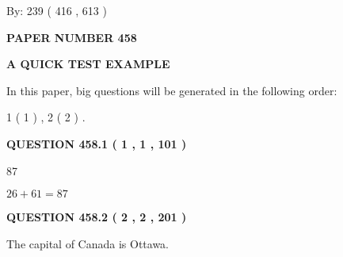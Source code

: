 \documentclass[12pt]{article}
\begin{document}
   
\hspace{1.0in} By: 
 239 ( 416 ,  613 )
   
   
   
   
\newpage 
\setcounter{page}{ 
   458001 } 
   
   
   
   
 {\textbf{ \Large{ PAPER NUMBER  458  }}}
   
   
\vspace{0.2in}
   
   
   
   
   
   
 \vspace{0.2in}
{\LARGE {\textbf{ A QUICK TEST EXAMPLE}}}
   
   
   
\vspace{0.2in}
   
In this paper, big questions will be generated in the following order: 
   
   
   1 ( 1 )
 ,
   2 ( 2 )
 .
  
\vspace{0.2in}
  
{\textbf{\Large{QUESTION
458.1 
 ( 1 , 1 , 101 )
}}}
  
  
 
 
\noindent{}

87
 
 
 
 
\noindent{}

$ %
26 +  %
61=   %
87$
 
 
  
\vspace{0.2in}
  
{\textbf{\Large{QUESTION
458.2 
 ( 2 , 2 , 201 )
}}}
  
  
 
 
\noindent{}
 
 
The capital of Canada is Ottawa.
 
 
 
 
   
   
 \vspace{0.2in}
 
\end{document}
